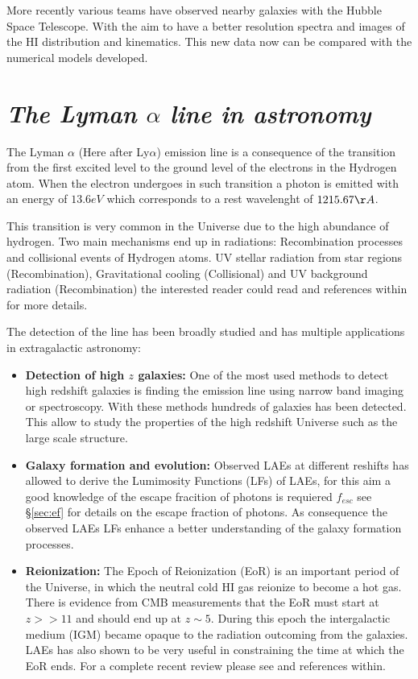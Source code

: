 More recently various teams \citep{Mas-Hesse09,LARS} have
observed nearby galaxies with the Hubble Space Telescope. With the
aim to have a better resolution spectra and images of the HI distribution 
and kinematics. This new data now can be compared with the numerical 
models developed.

 

\section{\emph{The Lyman $\alpha$ line in astronomy}}\label{sec:lyuses}

The Lyman $\alpha$ (Here after Ly$\alpha$) emission line is a consequence of the 
transition 
from the first excited level to the ground level of the electrons
in the Hydrogen atom. When the electron undergoes in such transition 
a photon is emitted with an energy of $13.6eV$ which corresponds to 
a rest wavelenght of $1215.67 \AA$. 

This transition is very common in the Universe due to the high abundance
of hydrogen. Two main mechanisms end up in \ly radiations: Recombination 
processes and collisional events of Hydrogen atoms. UV stellar radiation
from star regions (Recombination), Gravitational 
cooling (Collisional) and UV background radiation (Recombination) the interested
reader could read \citep{LaursenPhD} and references within for
more details. 

The detection of the \ly line has been broadly studied and has multiple 
applications in extragalactic astronomy:

\begin{itemize}
\item {\bf{Detection of high $z$ galaxies:}} One of the most used 
methods to detect high redshift galaxies is finding the \ly emission 
line using narrow band imaging or spectroscopy. With these methods 
hundreds of galaxies has been detected. This 
allow to study the properties of the high redshift Universe such as
the large scale structure. 
 
\item {\bf{Galaxy formation and evolution:}} Observed LAEs at different
reshifts has allowed to derive the Lumimosity Functions (LFs) of LAEs, 
for this aim a good knowledge of the escape fracition of 
photons is requiered $f_{esc}$ see \S \ref{sec:ef} for details on the escape 
fraction of \ly photons. As consequence the observed LAEs LFs enhance a
better understanding of the galaxy formation processes. 

\item {\bf{Reionization:}} The Epoch of Reionization (EoR) is an important
period of the Universe, in which the neutral cold HI gas reionize to 
become a hot gas. There is evidence from CMB measurements that 
the EoR must start at $z >> 11$ and should end up at $z\sim5$. During this 
epoch the intergalactic medium (IGM) became opaque to the \ly radiation 
outcoming from the galaxies. LAEs has also shown to be 
very useful in constraining the time at which the EoR ends. 
For a complete recent review please see \citep{review} and references
within.
 
\end{itemize}


